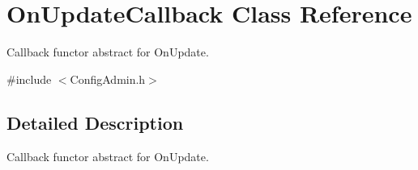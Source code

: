 \section{OnUpdateCallback Class Reference}
\label{classOnUpdateCallback}


Callback functor abstract for OnUpdate.  




{\ttfamily \#include $<$ConfigAdmin.h$>$}



\subsection{Detailed Description}
Callback functor abstract for OnUpdate. 